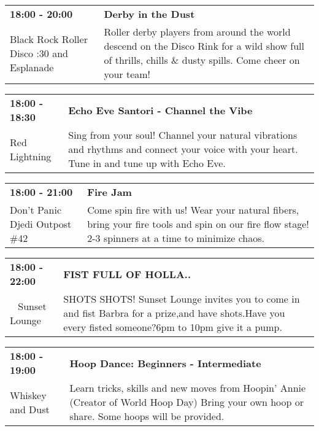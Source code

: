 \begin{tabular}{ p{1in} p{2.2in} }
    \textbf{18:00 - 20:00} & \textbf{Derby in the Dust} \\
    Black Rock Roller Disco \newline 7:30 and Esplanade & Roller derby players from around the world descend on the Disco Rink for a wild show full of thrills, chills \& dusty spills. Come cheer on your team! \\
    \hline 
\end{tabular}
    
\begin{tabular}{ p{1in} p{2.2in} }
    \textbf{18:00 - 18:30} & \textbf{Echo Eve Santori - Channel the Vibe} \\
    Red Lightning \newline  & Sing from your soul! Channel your natural vibrations and rhythms and connect your voice with your heart. Tune in and tune up with Echo Eve. \\
    \hline 
\end{tabular}
    
\begin{tabular}{ p{1in} p{2.2in} }
    \textbf{18:00 - 21:00} & \textbf{Fire Jam} \\
    Don't Panic Djedi Outpost \#42 \newline  & Come spin fire with us!  Wear your natural fibers, bring your fire tools and spin on our fire flow stage!  2-3 spinners at a time to minimize chaos. \\
    \hline 
\end{tabular}
    
\begin{tabular}{ p{1in} p{2.2in} }
    \textbf{18:00 - 22:00} & \textbf{FIST FULL OF HOLLA..} \\
    ~ \newline Sunset Lounge & SHOTS SHOTS! Sunset Lounge invites you to come in and fist Barbra for a prize,and have shots.Have you every fisted someone?6pm to 10pm give it a pump. \\
    \hline 
\end{tabular}
    
\begin{tabular}{ p{1in} p{2.2in} }
    \textbf{18:00 - 19:00} & \textbf{Hoop Dance: Beginners - Intermediate } \\
    Whiskey and Dust \newline  & Learn tricks, skills and new moves from Hoopin' Annie (Creator of World Hoop Day)  Bring your own hoop or share. Some hoops will be provided. \\
    \hline 
\end{tabular}
    
